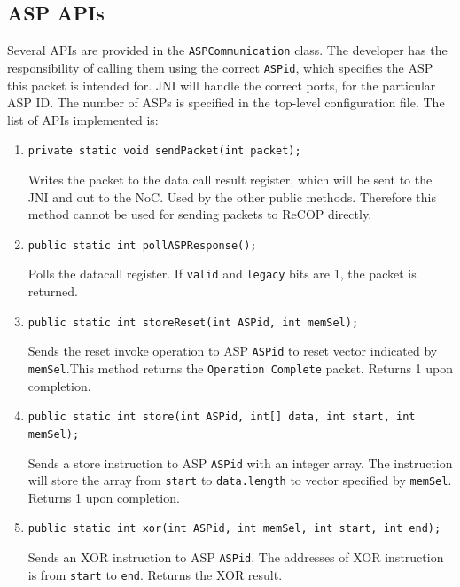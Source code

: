 \documentclass[]{article}
\begin{document}
	\subsection{ASP APIs}
	\label{sec:java_api}
	Several APIs are provided in the \texttt{ASPCommunication} class. The developer has the responsibility of calling them using the correct \texttt{ASPid}, which specifies the ASP this packet is intended for. JNI will handle the correct ports, for the particular ASP ID. The number of ASPs is specified in the top-level configuration file. The list of APIs implemented is:
	\begin{enumerate}
		\item \texttt{private static void sendPacket(int packet);}\par
		Writes the packet to the data call result register, which will be sent to the JNI and out to the NoC. Used by the other public methods. Therefore this method cannot be used for sending packets to ReCOP directly. \par \par
		
		\item \texttt{public static int pollASPResponse();}\par
		Polls the datacall register. If \texttt{valid} and \texttt{legacy} bits are 1, the packet is returned. \par \par
		
		\item \texttt{public static int storeReset(int ASPid, int memSel);}\par
		Sends the reset invoke operation to ASP \texttt{ASPid} to reset vector indicated by \texttt{memSel}.This method returns the \texttt{Operation Complete} packet. Returns 1 upon completion. \par \par
		
		\item \texttt{public static int store(int ASPid, int[] data, int start, int memSel);}\par
		Sends a store instruction to ASP \texttt{ASPid} with an integer array. The instruction will store the array from \texttt{start} to \texttt{data.length} to vector specified by \texttt{memSel}. Returns 1 upon completion. \par \par
		
		\item \texttt{public static int xor(int ASPid, int memSel, int start, int end);}\par
		Sends an XOR instruction to ASP \texttt{ASPid}. The addresses of XOR instruction is from \texttt{start} to \texttt{end}. Returns the XOR result. \par \par
		

\end{enumerate}
\end{document}
